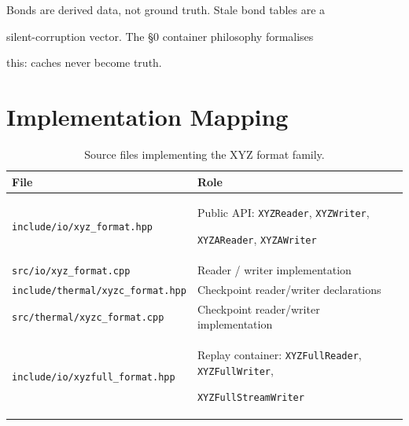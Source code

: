 \documentclass[12pt, a4paper, oneside]{article}
\newcommand{\file}[1]{\texttt{#1}}
\newcommand{\type}[1]{\texttt{#1}}
\begin{document}
Bonds are derived data, not ground truth.  Stale bond tables are a

silent-corruption vector.  The \S{}0 container philosophy formalises

this: caches never become truth.



\section{Implementation Mapping}

\label{sec:impl}



\begin{table}[htbp]

  \centering

  \caption{Source files implementing the XYZ format family.}

  \label{tab:impl}

  \begin{tabular}{lp{8.5cm}}

    \toprule

    File & Role \\

    \midrule

    \file{include/io/xyz\_format.hpp}

      & Public API: \type{XYZReader}, \type{XYZWriter},

        \type{XYZAReader}, \type{XYZAWriter} \\

    \file{src/io/xyz\_format.cpp}

      & Reader / writer implementation \\

    \file{include/thermal/xyzc\_format.hpp}

      & Checkpoint reader/writer declarations \\

    \file{src/thermal/xyzc\_format.cpp}

      & Checkpoint reader/writer implementation \\

    \file{include/io/xyzfull\_format.hpp}

      & Replay container: \type{XYZFullReader}, \type{XYZFullWriter},

        \type{XYZFullStreamWriter} \\


\end{tabular}
\end{table}
\end{document}

